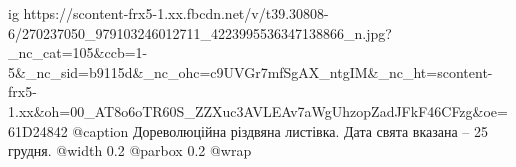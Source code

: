  
 
 
 
 

\ifcmt
  ig https://scontent-frx5-1.xx.fbcdn.net/v/t39.30808-6/270237050_979103246012711_4223995536347138866_n.jpg?_nc_cat=105&ccb=1-5&_nc_sid=b9115d&_nc_ohc=c9UVGr7mfSgAX_ntgIM&_nc_ht=scontent-frx5-1.xx&oh=00_AT8o6oTR60S_ZZXuc3AVLEAv7aWgUhzopZadJFkF46CFzg&oe=61D24842
  @caption Дореволюційна різдвяна листівка. Дата свята вказана – 25 грудня.
  @width 0.2
	@parbox 0.2
  @wrap \parpic[r]
\fi
